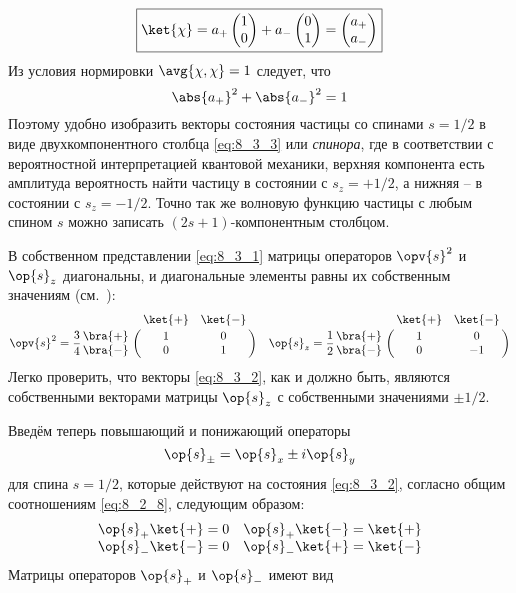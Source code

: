 \begin{equation}
\label{eq:8_3_3}
\boxed{
	\ket{\chi} = a_{+} \begin{pmatrix} 1 \\ 0 \end{pmatrix} + a_{-} \begin{pmatrix} 0 \\ 1 \end{pmatrix} = \begin{pmatrix} a_{+} \\ a_{-} \end{pmatrix}
}
\end{equation}%
%
Из условия нормировки $\avg{\chi, \chi} = 1$ следует, что 
$$
\abs{a_{+}}^2 + \abs{a_{-}}^2 = 1
$$%
%
Поэтому удобно изобразить векторы состояния частицы со спинами $s=1/2$ в виде двухкомпонентного столбца \eqref{eq:8_3_3} или {\em спинора}, где в соответствии с вероятностной интерпретацией квантовой механики, верхняя компонента есть амплитуда вероятность найти частицу в состоянии с $s_z = +1/2$, а нижняя -- в состоянии с $s_z = -1/2$. Точно так же волновую функцию частицы с любым спином $s$ можно записать $(2s+1)$-компонентным столбцом.

В собственном представлении \eqref{eq:8_3_1} матрицы операторов $\opv{s}^2$ и $\op{s}_z$ диагональны, и диагональные элементы равны их собственным значениям (см.~):
\begin{equation}
\label{eq:8_3_4}
\opv{s}^2 = \frac{3}{4}
	\bordermatrix{
            & \ket{+} & \ket{-} \cr
\bra{+} &  1         & 0        \cr
\bra{-}  &  0         & 1       \cr}
~~~\op{s}_z = \frac{1}{2}
	\bordermatrix{
            & \ket{+} & \ket{-} \cr
\bra{+} &  1         & 0        \cr
\bra{-}  &  0         & -1     	\cr}
\end{equation}%
%
Легко проверить, что векторы \eqref{eq:8_3_2}, как и должно быть, являются собственными векторами матрицы $\op{s}_z$ с собственными значениями $\pm 1/2$.

Введём теперь повышающий и понижающий операторы
$$
\op{s}_{\pm} = \op{s}_x \pm i\op{s}_y
$$%
%
для спина $s=1/2$, которые действуют на состояния \eqref{eq:8_3_2}, согласно общим соотношениям \eqref{eq:8_2_8}, следующим образом:
$$
\begin{matrix}
\op{s}_{+}\ket{+} = 0 & \op{s}_{+}\ket{-} = \ket{+} \\
\op{s}_{-}\ket{-} = 0 &  \op{s}_{-}\ket{+} = \ket{-}
\end{matrix}
$$%
%
Матрицы операторов $\op{s}_{+}$ и $\op{s}_{-}$ имеют вид

